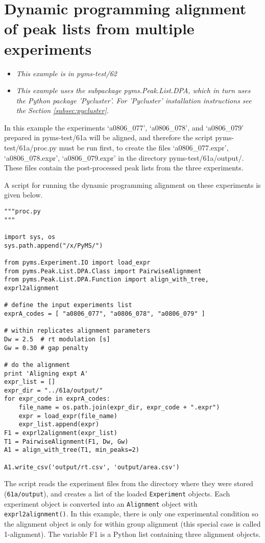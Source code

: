 \section{Dynamic programming alignment of peak lists from multiple experiments}

\noindent
\begin{itemize}
\item {\em This example is in pyms-test/62}
\item {\em This example uses the subpackage pyms.Peak.List.DPA, which in turn
uses the Python package 'Pycluster'.  For 'Pycluster' installation instructions
see the Section \ref{subsec:pycluster}.}
\end{itemize}

In this example the experiments `a0806\_077', `a0806\_078', and `a0806\_079'
prepared in pyms-test/61a will be aligned, and therefore the script
pyms-test/61a/proc.py must be run first, to create the files
`a0806\_077.expr', `a0806\_078.expr', `a0806\_079.expr' in the directory
pyms-test/61a/output/. These files contain the post-processed peak lists
from the three experiments.

A script for running the dynamic programming alignment on these experiments is
given below.

\begin{verbatim}
"""proc.py
"""

import sys, os
sys.path.append("/x/PyMS/")

from pyms.Experiment.IO import load_expr
from pyms.Peak.List.DPA.Class import PairwiseAlignment
from pyms.Peak.List.DPA.Function import align_with_tree, exprl2alignment

# define the input experiments list
exprA_codes = [ "a0806_077", "a0806_078", "a0806_079" ]

# within replicates alignment parameters
Dw = 2.5  # rt modulation [s]
Gw = 0.30 # gap penalty

# do the alignment
print 'Aligning expt A'
expr_list = []
expr_dir = "../61a/output/"
for expr_code in exprA_codes:
    file_name = os.path.join(expr_dir, expr_code + ".expr")
    expr = load_expr(file_name)
    expr_list.append(expr)
F1 = exprl2alignment(expr_list)
T1 = PairwiseAlignment(F1, Dw, Gw)
A1 = align_with_tree(T1, min_peaks=2)

A1.write_csv('output/rt.csv', 'output/area.csv')
\end{verbatim}


The script reads the experiment files from the directory where they were stored
({\tt 61a/output}), and creates a list of the loaded {\tt Experiment} objects.
Each experiment object is converted into an {\tt Alignment} object with {\tt
exprl2alignment()}. In this example, there is only one experimental condition
so the alignment object is only for within group alignment (this special case
is called 1-alignment). The variable F1 is a Python list containing three
alignment objects.

